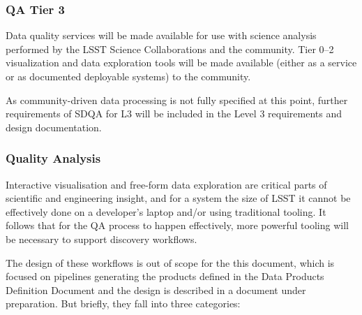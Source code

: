 \subsubsection{QA Tier 3}
\label{sec:qaQA3}

Data quality services will be made available for use with science analysis performed by the LSST Science Collaborations and the community. Tier 0--2 visualization and data exploration tools will be made available (either as a service or as documented deployable systems) to the community.

As community-driven data processing is not fully specified at this point, further requirements of SDQA for L3 will be included in the Level 3 requirements and design documentation.


\subsubsection{Quality Analysis}
\label{sec:qaInteractiveVis}

Interactive visualisation and free-form data exploration are critical parts of scientific and engineering insight, and for a system the size of LSST it cannot be effectively done on a developer's laptop and/or using traditional tooling. It follows that for the QA process to happen effectively, more powerful tooling will be necessary to support discovery workflows.

The design of these workflows is out of scope for the this document, which is focused on pipelines generating the products defined in the Data Products Definition Document and the design is described in a document under preparation. But briefly, they fall into three categories:

